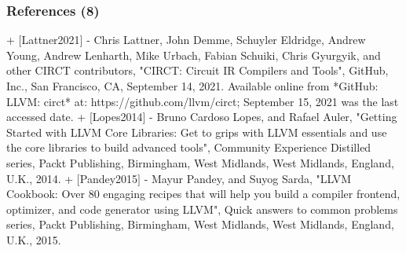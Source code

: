 \documentclass[xcolor={usenames,dvipsnames},hyperref={hyperindex,bookmarks}]{beamer}
\begin{document}
\begin{frame}
	\frametitle{References (8)}

+ $[$Lattner2021$]$
	- Chris Lattner, John Demme, Schuyler Eldridge, Andrew Young, Andrew Lenharth, Mike Urbach, Fabian Schuiki, Chris Gyurgyik, and {other CIRCT contributors}, "CIRCT: Circuit {IR} Compilers and Tools", {GitHub, Inc.}, San Francisco, {CA}, September 14, 2021. Available online from *{GitHub}: {LLVM}: circt* at: https://github.com/llvm/circt; September 15, 2021 was the last accessed date.
+ $[$Lopes2014$]$
	- Bruno Cardoso Lopes, and Rafael Auler, "Getting Started with {LLVM} Core Libraries: Get to grips with {LLVM} essentials and use the core libraries to build advanced tools", Community Experience Distilled series, Packt Publishing, Birmingham, West Midlands, West Midlands, England, {U.K.}, 2014.
+ $[$Pandey2015$]$
	- Mayur Pandey, and Suyog Sarda, "{LLVM} Cookbook: Over 80 engaging recipes that will help you build a compiler frontend, optimizer, and code generator using {LLVM}", Quick answers to common problems series, Packt Publishing, Birmingham, West Midlands, West Midlands, England, {U.K.}, 2015.


\end{frame}
\end{document}
